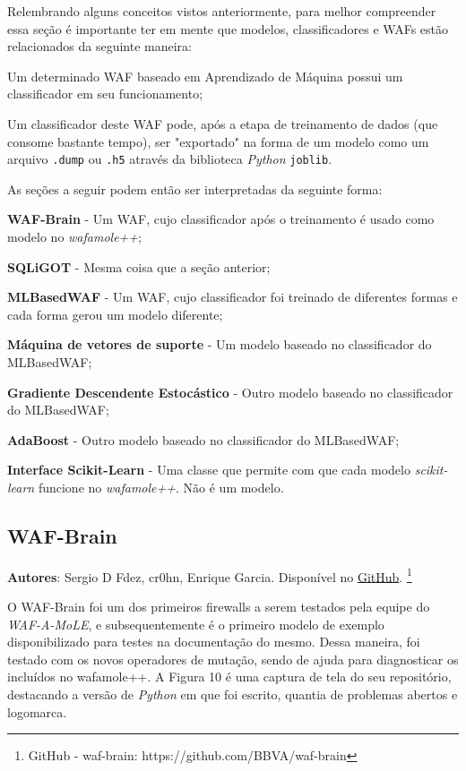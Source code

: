 Relembrando alguns conceitos vistos anteriormente, para melhor compreender essa seção é importante ter em mente que modelos, classificadores e WAFs estão relacionados da seguinte maneira: 

\begin{alineas}
\item Um determinado WAF baseado em Aprendizado de Máquina possui um classificador em seu funcionamento;
\item Um classificador deste WAF pode, após a etapa de treinamento de dados (que consome bastante tempo), ser "exportado" na forma de um modelo como um arquivo \verb+.dump+ ou \verb+.h5+ através da biblioteca \textit{Python} \verb+joblib+.
\end{alineas}

As seções a seguir podem então ser interpretadas da seguinte forma:
\begin{alineas}
\item \textbf{WAF-Brain} - Um WAF, cujo classificador após o treinamento é usado como modelo no \textit{wafamole++};
\item \textbf{SQLiGOT} - Mesma coisa que a seção anterior;
\item \textbf{MLBasedWAF} - Um WAF, cujo classificador foi treinado de diferentes formas e cada forma gerou um modelo diferente;
\item \textbf{Máquina de vetores de suporte} - Um modelo baseado no classificador do MLBasedWAF;
\item \textbf{Gradiente Descendente Estocástico} - Outro modelo baseado no classificador do MLBasedWAF;
\item \textbf{AdaBoost} - Outro modelo baseado no classificador do MLBasedWAF;
\item \textbf{Interface Scikit-Learn} - Uma classe que permite com que cada modelo \textit{scikit-learn} funcione no \textit{wafamole++}. Não é um modelo.
\end{alineas}
\subsection{WAF-Brain}

\textbf{Autores}: Sergio D Fdez, cr0hn, Enrique Garcia. Disponível no \href{https://github.com/BBVA/waf-brain}{GitHub}. \footnote{GitHub - waf-brain: https://github.com/BBVA/waf-brain}

O WAF-Brain \cite{waf_brain} foi um dos primeiros firewalls a serem testados pela equipe do \textit{WAF-A-MoLE}, e subsequentemente é o primeiro modelo de exemplo disponibilizado para testes na documentação do mesmo. Dessa maneira, foi testado com os novos operadores de mutação, sendo de ajuda para diagnosticar os incluídos no wafamole++. A Figura 10 é uma captura de tela do seu repositório, destacando a versão de \textit{Python} em que foi escrito, quantia de problemas abertos e logomarca.

